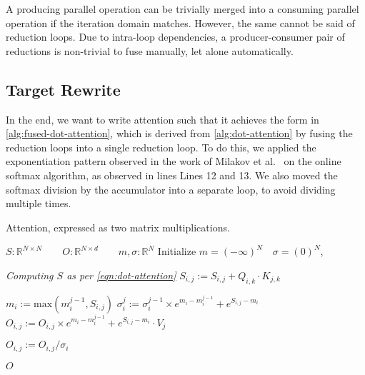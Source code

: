 \documentclass[review, anonymous, sigplan]{acmart}
\begin{document}
A producing parallel operation can be trivially merged into a consuming parallel operation if the iteration domain matches.
However, the same cannot be said of reduction loops. Due to intra-loop dependencies, a producer-consumer pair of reductions is non-trivial to fuse manually, let alone automatically. 


\subsection{Target Rewrite}

In the end, we want to write attention such that it achieves the form in \autoref{alg:fused-dot-attention}, which is derived from \autoref{alg:dot-attention} by fusing the reduction loops into a single reduction loop. To do this, we applied the exponentiation pattern observed in the work of Milakov et al.~\cite{milakov_online_2018} on the online softmax algorithm, as observed in lines 
Lines 12 and 13. We also moved the softmax division by the accumulator into a separate loop, to avoid dividing multiple times.

\begin{algorithm}
  \caption{Attention, expressed as two matrix multiplications.\label{alg:fused-dot-attention}}
  \begin{algorithmic}[1]

    \State $S : \mathbb{R}^{N \times N} \qquad 
            O : \mathbb{R}^{N \times d} \qquad
            m, \sigma :\mathbb{R}^N$
    \State Initialize $m = (-\infty)^N \quad \sigma = (0)^N$,

    \State \emph{Computing $S$ as per \autoref{eqn:dot-attention}}
        \State $S_{i,j} := S_{i,j} + Q_{i,k} \cdot K_{j,k}$
      \EndFor
    \EndFor


        \State $m_i := \text{max}(m_i^{j-1}, S_{i,j})$
        \State $\sigma_i^j := \sigma_i^{j-1} \times e^{m_i - m_i^{j-1}} + e^{S_{i,j} - m_i}$
        \State $O_{i,j} := O_{i,j} \times e^{m_i - m_i^{j-1}} + e^{S_{i,j} - m_i} \cdot V_{j}$
      \EndFor
    \EndFor

      \State $O_{i,j} := O_{i,j} / \sigma_i$
    \EndFor

    \Return $O$
  \EndFunction
  \end{algorithmic}
\end{algorithm}
\end{document}
